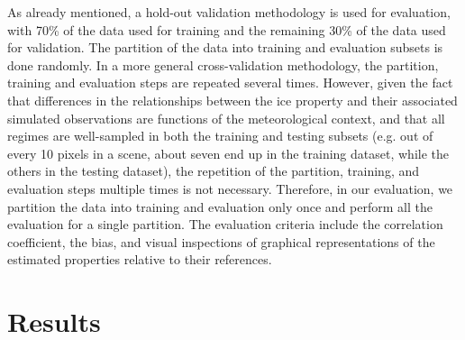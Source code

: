 \documentclass{ametsocV6.1}
\begin{document}
As already mentioned, a hold-out validation methodology is used for evaluation, with 70\% of the data used for training and the remaining 30\% of the data used for validation.  The partition of the data into training and evaluation subsets is done randomly.  In a more general cross-validation methodology, the partition, training and evaluation steps are repeated several times.  However, given the fact that differences in the relationships between the ice property and their associated simulated observations are functions of the meteorological context, and that all regimes are well-sampled in both the training and testing subsets (e.g. out of every 10 pixels in a scene, about seven end up in the training dataset, while the others in the testing dataset), the repetition of the partition, training, and evaluation steps multiple times is not necessary. Therefore, in our evaluation, we partition the data into training and evaluation only once and perform all the evaluation for a single partition. The evaluation criteria include the correlation coefficient, the bias, and visual inspections of graphical representations of the estimated properties relative to their references.

\section{Results}
\end{document}
